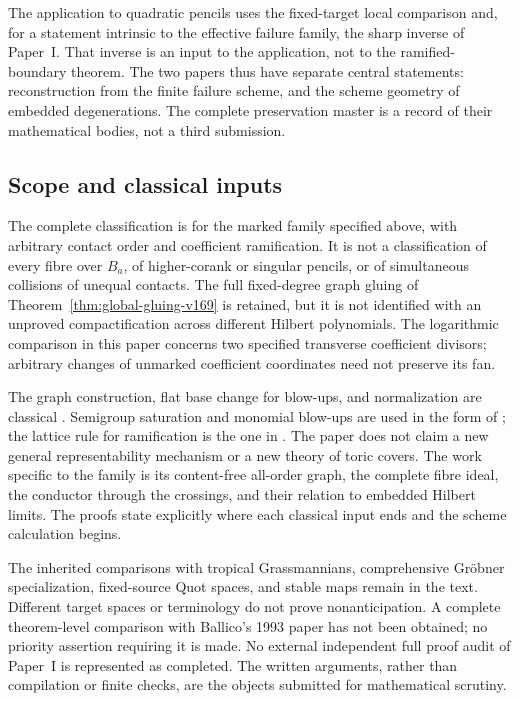 \documentclass[11pt,reqno]{amsart}
\numberwithin{equation}{section}
\theoremstyle{definition}\newtheorem{definition}[theorem]{Definition}
\theoremstyle{remark}\newtheorem{remark}[theorem]{Remark}
\begin{document}
The application to quadratic pencils uses the fixed-target local
comparison and, for a statement intrinsic to the effective failure
family, the sharp inverse of Paper~I. That inverse is an input to
the application, not to the ramified-boundary theorem. The two papers
thus have separate central statements: reconstruction from the finite
failure scheme, and the scheme geometry of embedded degenerations.
The complete preservation master is a record of their mathematical
bodies, not a third submission.

\subsection*{Scope and classical inputs}
The complete classification is for the marked family specified above,
with arbitrary contact order and coefficient ramification. It is not
a classification of every fibre over $B_a$, of higher-corank or
singular pencils, or of simultaneous collisions of unequal contacts.
The full fixed-degree graph gluing of
Theorem~\ref{thm:global-gluing-v169} is retained, but it is not
identified with an unproved compactification across different
Hilbert polynomials. The logarithmic comparison in this paper concerns
two specified transverse coefficient divisors; arbitrary changes of
unmarked coefficient coordinates need not preserve its fan.

The graph construction, flat base change for blow-ups, and normalization
are classical \cite{Stacks169}. Semigroup saturation and monomial
blow-ups are used in the form of
\cite[Proposition~5 and Section~2.6]{GonzalezTeissier170}; the lattice
rule for ramification is the one in
\cite[Definition~1 and Lemma~1]{AlexeevPardini170}.
The paper does not claim a new general representability mechanism
or a new theory of toric covers. The work specific to the family is
its content-free all-order graph, the complete fibre ideal, the
conductor through the crossings, and their relation to embedded
Hilbert limits. The proofs state explicitly where each classical
input ends and the scheme calculation begins.

The inherited comparisons with tropical Grassmannians, comprehensive
Gr\"obner specialization, fixed-source Quot spaces, and stable maps
remain in the text. Different target spaces or terminology do not
prove nonanticipation. A complete theorem-level comparison with
Ballico's 1993 paper has not been obtained; no priority assertion
requiring it is made. No external independent full proof audit of
Paper~I is represented as completed. The written arguments, rather
than compilation or finite checks, are the objects submitted for
mathematical scrutiny.
\end{document}
